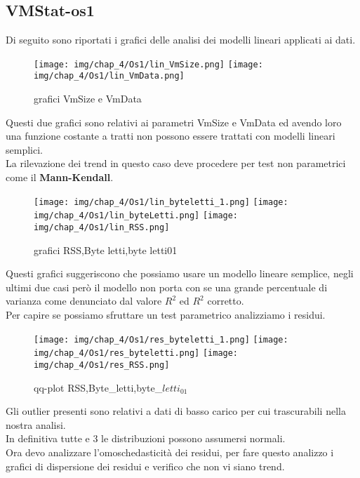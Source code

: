 \subsection{VMStat-os1}
Di seguito sono riportati i grafici delle analisi dei modelli lineari applicati ai dati.
\begin{figure}[H]
    \centering
    \texttt{[image: img/chap\_4/Os1/lin\_VmSize.png]}
    \texttt{[image: img/chap\_4/Os1/lin\_VmData.png]}
    \caption{grafici VmSize e VmData}
    \label{fig:sis_2_25_k}
\end{figure}
\noindent
Questi due grafici sono relativi ai parametri VmSize e VmData ed avendo loro una funzione costante a tratti non possono essere trattati con modelli lineari semplici.\\
La rilevazione dei trend in questo caso deve procedere per test non parametrici come il \textbf{Mann-Kendall}.\\
\begin{figure}[H]
    \centering
    \texttt{[image: img/chap\_4/Os1/lin\_byteletti\_1.png]}
    \texttt{[image: img/chap\_4/Os1/lin\_byteLetti.png]}
    \texttt{[image: img/chap\_4/Os1/lin\_RSS.png]}
    \caption{grafici RSS,Byte letti,byte letti01}
    \label{fig:sis_2_25_k}
\end{figure}
\noindent
Questi grafici suggeriscono che possiamo usare un modello lineare semplice, negli ultimi due casi però il modello non porta con se una grande percentuale di varianza come denunciato dal valore $R^2$ ed $R^2$ corretto.\\
Per capire se possiamo sfruttare un test parametrico analizziamo i residui.
\begin{figure}[H]
    \centering
    \texttt{[image: img/chap\_4/Os1/res\_byteletti\_1.png]}
    \texttt{[image: img/chap\_4/Os1/res\_byteletti.png]}
    \texttt{[image: img/chap\_4/Os1/res\_RSS.png]}
    \caption{qq-plot RSS,Byte\_letti,byte\_$letti_{01}$}
    \label{fig:residui}
\end{figure}
\noindent
Gli outlier presenti sono relativi a dati di basso carico per cui trascurabili nella nostra analisi.\\
In definitiva tutte e 3 le distribuzioni possono assumersi normali.\\
Ora devo analizzare l'omoschedasticità dei residui, per fare questo analizzo i grafici di dispersione dei residui e verifico che non vi siano trend.\\

